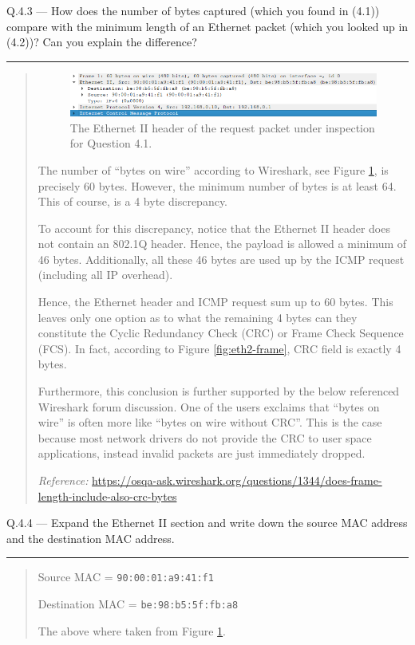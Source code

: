 \documentclass{article}
\newcommand\Que[2]{%
\begin{samepage}
\leavevmode\par
\noindent
Q.#1 --- #2\par\vspace{10pt}\hrule\vspace{10pt}
\end{samepage}}
\newenvironment{ans}
{\fbox{Answer}\begin{quote}\nopagebreak}
{\end{quote}}
\newcommand\Refer[1]{
\begin{center}
{\small\textit{Reference:} \url{#1}}
\end{center}
}%
\begin{document}
\Que{4.3}{How does the number of bytes captured (which you found
in (4.1)) compare with the minimum length of an Ethernet packet
(which you looked up in (4.2))? Can you explain the difference?}

\begin{ans}
\begin{figure}[H]
\centering
\includegraphics[width=14cm]{data/q4.3-ethernet-header.png}
\caption{The Ethernet II header of the request packet under
inspection for Question 4.1.}
\label{fig:eth2-header-for-q4.3}
\end{figure}

The number of ``bytes on wire'' according to Wireshark, see
Figure \ref{fig:eth2-header-for-q4.3}, is precisely 60
bytes. However, the minimum number of bytes is at least 64.
This of course, is a 4 byte discrepancy.

To account for this discrepancy, notice that the Ethernet
II header does not contain an 802.1Q header. Hence, the
payload is allowed a minimum of 46 bytes. Additionally, all
these 46 bytes are used up by the ICMP request (including
all IP overhead).

Hence, the Ethernet header and ICMP request sum up to 60
bytes. This leaves only one option as to what the remaining
4 bytes can they constitute the Cyclic Redundancy Check
(CRC) or Frame Check Sequence (FCS). In fact, according to
Figure \ref{fig:eth2-frame}, CRC field is exactly 4 bytes.

Furthermore, this conclusion is further supported by the
below referenced Wireshark forum discussion. One of the
users exclaims that ``bytes on wire'' is often more like
``bytes on wire without CRC''. This is the case because
most network drivers do not provide the CRC to user space
applications, instead invalid packets are just immediately
dropped.

\Refer{https://osqa-ask.wireshark.org/questions/1344/does-frame-length-include-also-crc-bytes}
\end{ans}

\Que{4.4}{Expand the Ethernet II section and write down the
source MAC address and the destination MAC address.}

\begin{ans}
Source MAC = \texttt{90:00:01:a9:41:f1}

Destination MAC = \texttt{be:98:b5:5f:fb:a8}

The above where taken from Figure
\ref{fig:eth2-header-for-q4.3}.
\end{ans}
\end{document}
